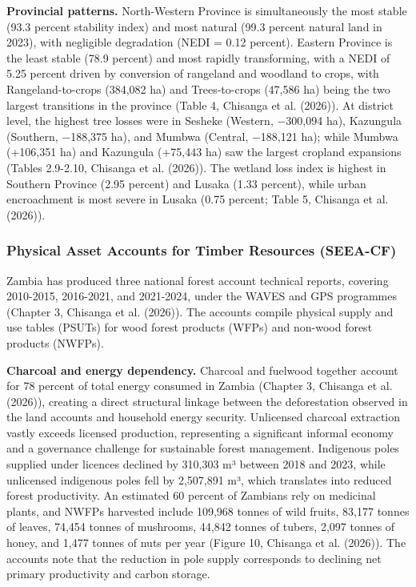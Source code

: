 \documentclass[
  letterpaper,
  DIV=11,
  numbers=noendperiod]{scrartcl}
\begin{document}
\textbf{Provincial patterns.} North-Western Province is simultaneously
the most stable (93.3 percent stability index) and most natural (99.3
percent natural land in 2023), with negligible degradation (NEDI = 0.12
percent). Eastern Province is the least stable (78.9 percent) and most
rapidly transforming, with a NEDI of 5.25 percent driven by conversion
of rangeland and woodland to crops, with Rangeland-to-crops (384,082 ha)
and Trees-to-crops (47,586 ha) being the two largest transitions in the
province (Table 4, Chisanga et al. (2026)). At district level, the
highest tree losses were in Sesheke (Western, −300,094 ha), Kazungula
(Southern, −188,375 ha), and Mumbwa (Central, −188,121 ha); while Mumbwa
(+106,351 ha) and Kazungula (+75,443 ha) saw the largest cropland
expansions (Tables 2.9-2.10, Chisanga et al. (2026)). The wetland loss
index is highest in Southern Province (2.95 percent) and Lusaka (1.33
percent), while urban encroachment is most severe in Lusaka (0.75
percent; Table 5, Chisanga et al. (2026)).

\subsubsection{Physical Asset Accounts for Timber Resources
(SEEA-CF)}\label{physical-asset-accounts-for-timber-resources-seea-cf}

Zambia has produced three national forest account technical reports,
covering 2010-2015, 2016-2021, and 2021-2024, under the WAVES and GPS
programmes (Chapter 3, Chisanga et al. (2026)). The accounts compile
physical supply and use tables (PSUTs) for wood forest products (WFPs)
and non-wood forest products (NWFPs).

\textbf{Charcoal and energy dependency.} Charcoal and fuelwood together
account for 78 percent of total energy consumed in Zambia (Chapter 3,
Chisanga et al. (2026)), creating a direct structural linkage between
the deforestation observed in the land accounts and household energy
security. Unlicensed charcoal extraction vastly exceeds licensed
production, representing a significant informal economy and a governance
challenge for sustainable forest management. Indigenous poles supplied
under licences declined by 310,303 m³ between 2018 and 2023, while
unlicensed indigenous poles fell by 2,507,891 m³, which translates into
reduced forest productivity. An estimated 60 percent of Zambians rely on
medicinal plants, and NWFPs harvested include 109,968 tonnes of wild
fruits, 83,177 tonnes of leaves, 74,454 tonnes of mushrooms, 44,842
tonnes of tubers, 2,097 tonnes of honey, and 1,477 tonnes of nuts per
year (Figure 10, Chisanga et al. (2026)). The accounts note that the
reduction in pole supply corresponds to declining net primary
productivity and carbon storage.
\end{document}
